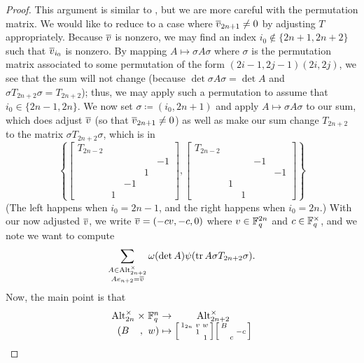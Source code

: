 \begin{proof}
    This argument is similar to , but we are more careful with the permutation matrix. We would like to reduce to a case where $\overline{v}_{2n+1}\ne0$ by adjusting $T$ appropriately. Because $\overline{v}$ is nonzero, we may find an index $i_0\notin\{2n+1,2n+2\}$ such that $\overline{v}_{i_0}$ is nonzero. By mapping $A\mapsto\sigma A\sigma$ where $\sigma$ is the permutation matrix associated to some permutation of the form $(2i-1,2j-1)(2i,2j)$, we see that the sum will not change (because $\det\sigma A\sigma=\det A$ and $\sigma T_{2n+2}\sigma=T_{2n+2}$); thus, we may apply such a permutation to assume that $i_0\in\{2n-1,2n\}$. We now set $\sigma\coloneqq(i_0,2n+1)$ and apply $A\mapsto\sigma A\sigma$ to our sum, which does adjust $\overline{v}$ (so that $\overline{v}_{2n+1}\ne0$) as well as make our sum change $T_{2n+2}$ to the matrix $\sigma T_{2n+2}\sigma$, which is in
    \[\left\{\begin{bmatrix}
        T_{2n-2} \\
        &&&& -1 \\ &&& 1 \\ && -1 \\ & 1
    \end{bmatrix},\begin{bmatrix}
        T_{2n-2} \\
        &&& -1 \\ &&&& -1 \\ & 1 \\ && 1
    \end{bmatrix}\right\}\]
    (The left happens when $i_0=2n-1$, and the right happens when $i_0=2n$.) With our now adjusted $\overline{v}$, we write $\overline{v}=(-cv,-c,0)$ where $v\in\mathbb F_q^{2n}$ and $c\in\mathbb F_q^\times$, and we note we want to compute
    \[\sum_{\substack{A\in\operatorname{Alt}_{2n+2}^\times\\Ae_{n+2}=\overline{v}}}\omega(\det A)\psi(\operatorname{tr} A\sigma T_{2n+2}\sigma).\]
    Now, the main point is that
    \[\arraycolsep=1.4pt\begin{array}{cccccc}
        \Alt_{2n}^\times &\times& \FF_q^n &\to& \Alt_{2n+2}^\times \\
        (B &,& w) &\mapsto& \begin{bsmallmatrix}
            1_{2n} & v & w \\
            & 1 \\ && 1
        \end{bsmallmatrix}\begin{bsmallmatrix}
            B \\ && -c \\ & c

\end{bsmallmatrix}
\end{array}\]
\end{proof}
